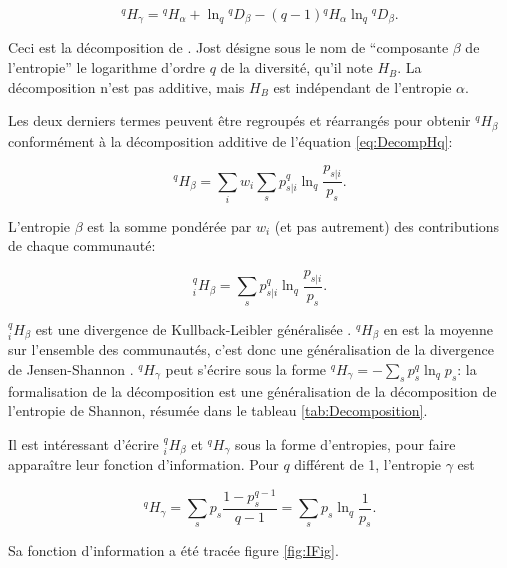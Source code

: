 \documentclass[
  11pt,
  french,
  a4paper,
  extrafontsizes,onecolumn,openright
  ]{memoir}
\begin{document}
\begin{equation}
  \label{eq:DecompJost}
  ^{q}\!H_{\gamma} = {^{q}\!H_{\alpha}}+\ln_q{^{q}\!D_{\beta}}-\left(q-1\right){^{q}\!H_{\alpha}}\ln_q{^{q}\!D_{\beta}}.
\end{equation}

Ceci est la décomposition de \textcite{Jost2007}.
Jost désigne sous le nom de \enquote{composante \(\beta\) de l'entropie} le logarithme d'ordre \(q\) de la diversité, qu'il note \(H_B\).
La décomposition n'est pas additive, mais \(H_B\) est indépendant de l'entropie \(\alpha\).

Les deux derniers termes peuvent être regroupés et réarrangés pour obtenir \(^{q}\!H_{\beta}\) conformément à la décomposition additive de l'équation \eqref{eq:DecompHq}:

\begin{equation}
  \label{eq:ContributionBeta}
  ^{q}\!H_{\beta} = \sum_i{w_i\sum_s{p^q_{s|i}\ln_q\frac{p_{s|i}}{p_s}}}.
\end{equation}

L'entropie \(\beta\) est la somme pondérée par \(w_i\) (et pas autrement) des contributions de chaque communauté:

\begin{equation}
  \label{eq:PoidsHbetai}
  ^{q}_{i}\!H_{\beta}=\sum_s{p^q_{s|i}\ln_q\frac{p_{s|i}}{p_s}}.
\end{equation}

\(^{q}_{i}\!H_{\beta}\) est une divergence de Kullback-Leibler généralisée \autocite{Borland1998,Tsallis1998}.
\(^{q}\!H_{\beta}\) en est la moyenne sur l'ensemble des communautés, c'est donc une généralisation de la divergence de Jensen-Shannon \autocite{Marcon2014a}.
\(^{q}\!H_{\gamma}\) peut s'écrire sous la forme \(^{q}\!H_{\gamma} = -\sum_s{p^q_s}\ln_q{p_s}\): la formalisation de la décomposition est une généralisation de la décomposition de l'entropie de Shannon, résumée dans le tableau \ref{tab:Decomposition}.

Il est intéressant d'écrire \(^{q}_{i}\!H_{\beta}\) et \(^{q}\!H_{\gamma}\) sous la forme d'entropies, pour faire apparaître leur fonction d'information.
Pour \(q\) différent de 1, l'entropie \(\gamma\) est

\begin{equation}
  \label{eq:Hqgamma}
  ^{q}\!H_{\gamma} 
  = \sum_s{p_s\frac{1-p^{q-1}_s}{q-1}}
  = \sum_s{p_s\ln_q\frac{1}{p_s}}.
\end{equation}

Sa fonction d'information a été tracée figure \ref{fig:IFig}.
\end{document}
